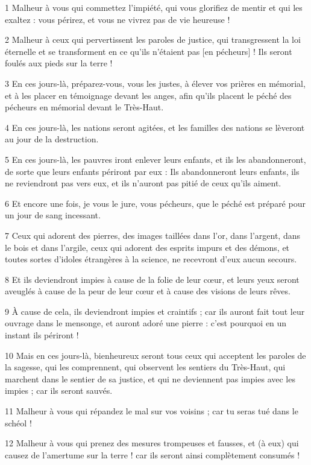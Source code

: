 \par 1 Malheur à vous qui commettez l'impiété, qui vous glorifiez de mentir et qui les exaltez : vous périrez, et vous ne vivrez pas de vie heureuse !
\par 2 Malheur à ceux qui pervertissent les paroles de justice, qui transgressent la loi éternelle et se transforment en ce qu'ils n'étaient pas [en pécheurs] ! Ils seront foulés aux pieds sur la terre !
\par 3 En ces jours-là, préparez-vous, vous les justes, à élever vos prières en mémorial, et à les placer en témoignage devant les anges, afin qu'ils placent le péché des pécheurs en mémorial devant le Très-Haut.
\par 4 En ces jours-là, les nations seront agitées, et les familles des nations se lèveront au jour de la destruction.
\par 5 En ces jours-là, les pauvres iront enlever leurs enfants, et ils les abandonneront, de sorte que leurs enfants périront par eux : Ils abandonneront leurs enfants, ils ne reviendront pas vers eux, et ils n'auront pas pitié de ceux qu'ils aiment.
\par 6 Et encore une fois, je vous le jure, vous pécheurs, que le péché est préparé pour un jour de sang incessant.
\par 7 Ceux qui adorent des pierres, des images taillées dans l'or, dans l'argent, dans le bois et dans l'argile, ceux qui adorent des esprits impurs et des démons, et toutes sortes d'idoles étrangères à la science, ne recevront d'eux aucun secours.
\par 8 Et ils deviendront impies à cause de la folie de leur cœur, et leurs yeux seront aveuglés à cause de la peur de leur cœur et à cause des visions de leurs rêves.
\par 9 À cause de cela, ils deviendront impies et craintifs ; car ils auront fait tout leur ouvrage dans le mensonge, et auront adoré une pierre : c'est pourquoi en un instant ils périront !
\par 10 Mais en ces jours-là, bienheureux seront tous ceux qui acceptent les paroles de la sagesse, qui les comprennent, qui observent les sentiers du Très-Haut, qui marchent dans le sentier de sa justice, et qui ne deviennent pas impies avec les impies ; car ils seront sauvés.
\par 11 Malheur à vous qui répandez le mal sur vos voisins ; car tu seras tué dans le schéol !
\par 12 Malheur à vous qui prenez des mesures trompeuses et fausses, et (à eux) qui causez de l'amertume sur la terre ! car ils seront ainsi complètement consumés !
